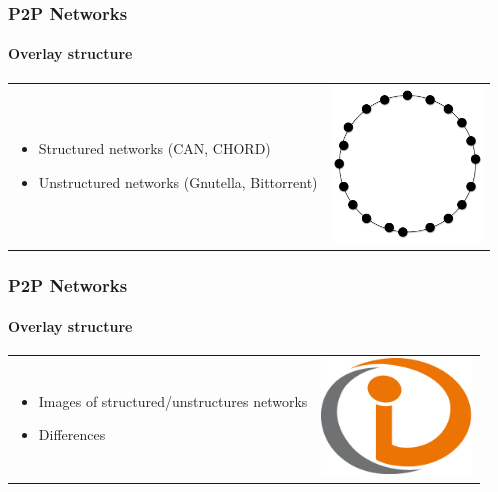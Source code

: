 \documentclass[12pt]{beamer}
\begin{document}
  \begin{frame}
  \frametitle{P2P Networks}
  \framesubtitle{Overlay structure}
  \begin{table}
  \begin{tabular}{p{7cm}p{3cm}}
  \begin{itemize}
      \item Structured networks (CAN, CHORD)
      \item Unstructured networks (Gnutella, Bittorrent)
  \end{itemize}
  &
  \vspace{1.5cm}
  \includegraphics[width=4cm]{../../presentacion/img/p2p-structured}\\
  \end{tabular}
  \end{table}
  \end{frame}
  
  \begin{frame}
  \frametitle{P2P Networks}
  \framesubtitle{Overlay structure}
  \begin{table}
  \begin{tabular}{p{7cm}p{3cm}}
  \begin{itemize}
      \item Images of structured/unstructures networks
      \item Differences
  \end{itemize}
  &
  \vspace{1.5cm}
  \includegraphics[width=4cm]{../../presentacion/img/example}\\
  \end{tabular}
  \end{table}
  \end{frame}
  
\end{document}
